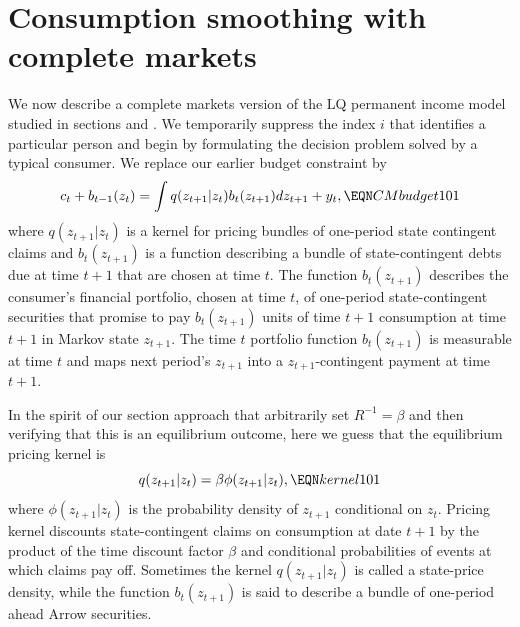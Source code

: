 \section{Consumption smoothing with complete markets}\label{sec:LQcomplete}%
We now describe a complete markets
version of the LQ permanent income model 
studied in sections  and 
. 
 We temporarily  suppress the 
index $i$ that identifies  a particular person  and begin by formulating 
the decision  problem solved by a typical   consumer. 
We replace our earlier budget constraint   by
$$ c_t + b_{t-1}(z_t) = \int  q(z_{t+1} | z_t ) b_t(z_{t+1}) 
d z_{t+1} + y_t , \EQN CMbudget101 $$
where $q(z_{t+1} | z_t)$ is a  kernel for pricing bundles of  one-period  state contingent claims and $b_t(z_{t+1})$ is 
a function describing a bundle of state-contingent debts 
due at time $t+1$ that are chosen at time $t$. The 
function $b_{t}(z_{t+1})$ describes the consumer's financial portfolio, chosen  at time $t$,  of one-period state-contingent
securities  that promise to pay  $b_{t}(z_{t+1})$ units 
of time $t+1$ consumption at time $t+1$ in Markov state 
$z_{t+1}$. The time $t$ portfolio function    
$b_{t}(z_{t+1})$
is measurable at time $t$ and maps next period's 
$z_{t+1}$
into a $z_{t+1}$-contingent payment 
at time $t+1$.

In the spirit of our section  approach  that 
arbitrarily set $R^{-1}=\beta$ and then verifying %
that this is an equilibrium outcome, here we guess that the equilibrium 
pricing kernel is 
$$ q(z_{t+1} | z_t ) = \beta \phi(z_{t+1} | z_t) , \EQN kernel101 $$
where $\phi(z_{t+1} | z_t)$ is the probability density of 
$z_{t+1}$ conditional on $z_t$. 
Pricing kernel  discounts state-contingent claims on consumption at date $t+1$ by the product of the time  discount factor $\beta$ and  conditional probabilities of    events
at which  claims pay off. 
Sometimes the kernel $q(z_{t+1} | z_t)$ is called  a state-price density,
while  the function $b_t(z_{t+1})$ is said to describe a bundle of one-period ahead Arrow securities.


